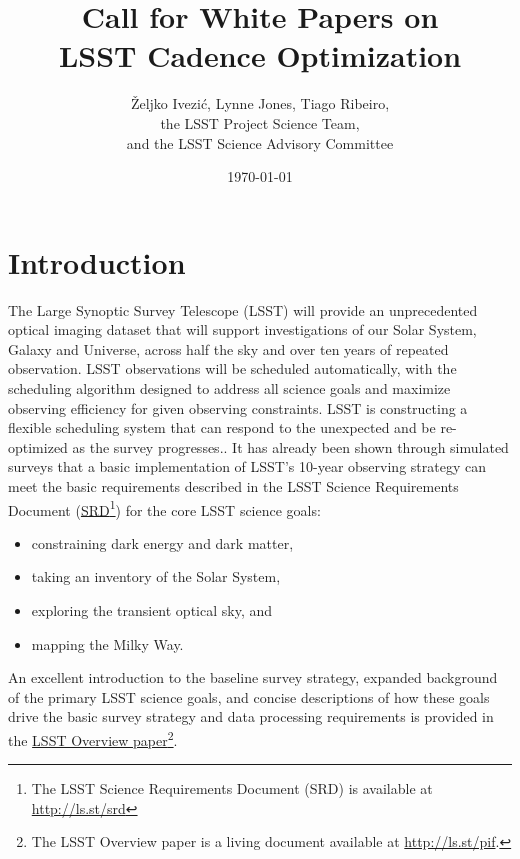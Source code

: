 \documentclass[DM,lsstdraft,toc,usenatbib]{lsstdoc}
\title[Call for LSST Cadence White Papers]{Call for White Papers on \\ LSST Cadence Optimization}
\author{\v{Z}eljko Ivezi\'{c}, Lynne Jones, Tiago Ribeiro, \\
                 the LSST Project Science Team, \\
                 and  the LSST Science Advisory Committee}
\date{\today}
\begin{document}
\maketitle


\section{Introduction} 

The Large Synoptic Survey Telescope (LSST) will provide an unprecedented optical 
imaging dataset that will support investigations of our Solar System, Galaxy and Universe, 
across half the sky and over ten years of repeated observation. LSST observations will be
scheduled automatically, with the scheduling algorithm designed to address all science goals 
and maximize observing efficiency for given observing constraints. LSST is constructing a 
flexible scheduling system that can respond to the unexpected and be re-optimized as the survey progresses.. 
It has already been shown through simulated surveys that a basic implementation of LSST's 
10-year observing strategy can meet the basic requirements
described in the LSST Science Requirements Document (\href{http://ls.st/srd}{SRD}\footnote{The LSST Science 
Requirements Document (SRD) is available at \href{http://ls.st/srd}{http://ls.st/srd}})
for the core LSST science goals:
\begin{itemize}
\item constraining dark energy and dark matter,
\item taking an inventory of the Solar System,
\item exploring the transient optical sky, and
\item mapping the Milky Way.
\end{itemize}
An excellent introduction to the baseline survey strategy, expanded background of the primary LSST science 
goals, and concise descriptions of how these goals drive the basic survey strategy and data processing
requirements is provided in the \href{http://ls.st/pif}{LSST Overview paper}\footnote{The LSST Overview 
paper is a living document available at \href{http://ls.st/pif}{http://ls.st/pif}.}.
\end{document}
